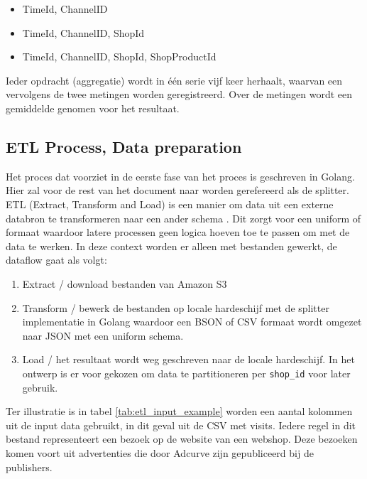 \begin{itemize}
    \item TimeId, ChannelID
    \item TimeId, ChannelID, ShopId
    \item TimeId, ChannelID, ShopId, ShopProductId
\end{itemize}

Ieder opdracht (aggregatie) wordt in één serie vijf keer herhaalt, waarvan een vervolgens de twee metingen worden geregistreerd. Over de metingen wordt een gemiddelde genomen voor het resultaat.

\subsection{ETL Process, Data preparation}

Het proces dat voorziet in de eerste fase van het proces is geschreven in Golang. Hier zal voor de rest van het document naar worden gerefereerd als de splitter. ETL (Extract, Transform and Load) is een manier om data uit een externe databron te transformeren naar een ander schema   \parencite{data-mining}. Dit zorgt voor een uniform of formaat waardoor latere processen geen logica hoeven toe te passen om met de data te werken. In deze context worden er alleen met bestanden gewerkt, de dataflow gaat als volgt:

\begin{enumerate}
    \item Extract / download bestanden van Amazon S3
    \item Transform / bewerk de bestanden op locale hardeschijf met de splitter implementatie in Golang waardoor een BSON of CSV formaat wordt omgezet naar JSON met een uniform schema.
    \item Load / het resultaat wordt weg geschreven naar de locale hardeschijf. In het ontwerp is er voor gekozen om data te partitioneren per \verb+shop_id+ voor later gebruik.
\end{enumerate}

Ter illustratie is in tabel \ref{tab:etl_input_example} worden een aantal kolommen uit de input data gebruikt, in dit geval uit de CSV met visits. Iedere regel in dit bestand representeert een bezoek op de website van een webshop. Deze bezoeken komen voort uit advertenties die door Adcurve zijn gepubliceerd bij de publishers.

